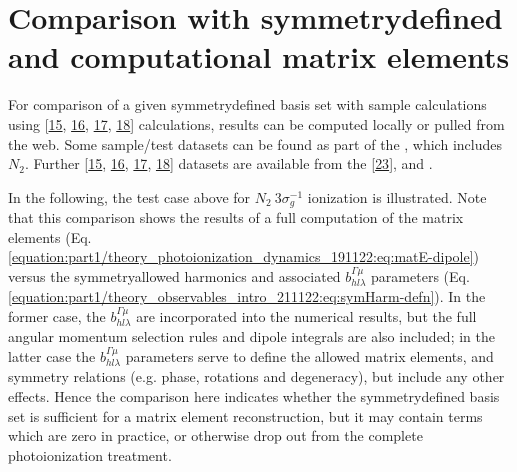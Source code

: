 \documentclass[letterpaper,table,10pt,english]{jupyterBook}
\begin{document}
\section{Comparison with symmetry\sphinxhyphen{}defined and computational matrix elements}
\label{\detokenize{part2/sym-fitting-intro_220423:comparison-with-symmetry-defined-and-computational-matrix-elements}}\label{\detokenize{part2/sym-fitting-intro_220423:sec-basis-sets-comparison-with-abinitio}}
\sphinxAtStartPar
For comparison of a given symmetry\sphinxhyphen{}defined basis set with sample  calculations using  {[}\hyperlink{cite.backmatter/bibliography:id693}{15}, \hyperlink{cite.backmatter/bibliography:id567}{16}, \hyperlink{cite.backmatter/bibliography:id725}{17}, \hyperlink{cite.backmatter/bibliography:id696}{18}{]} calculations, results can be computed locally or pulled from the web. Some sample/test datasets can be found as part of the , which includes \(N_2\). Further  {[}\hyperlink{cite.backmatter/bibliography:id693}{15}, \hyperlink{cite.backmatter/bibliography:id567}{16}, \hyperlink{cite.backmatter/bibliography:id725}{17}, \hyperlink{cite.backmatter/bibliography:id696}{18}{]} datasets are available from the  {[}\hyperlink{cite.backmatter/bibliography:id615}{23}{]}, and .

\sphinxAtStartPar
In the following, the test case above for \(N_2~3\sigma_g^{-1}\) ionization is illustrated. Note that this comparison shows the results of a full  computation of the matrix elements (Eq. \eqref{equation:part1/theory_photoionization_dynamics_191122:eq:matE-dipole}) versus the symmetry\sphinxhyphen{}allowed harmonics and associated \(b_{hl\lambda}^{\Gamma\mu}\) parameters (Eq. \eqref{equation:part1/theory_observables_intro_211122:eq:symHarm-defn}). In the former case, the \(b_{hl\lambda}^{\Gamma\mu}\) are incorporated into the numerical results, but the full angular momentum selection rules and dipole integrals are also included; in the latter case the \(b_{hl\lambda}^{\Gamma\mu}\) parameters serve to define the allowed matrix elements, and symmetry relations (e.g. phase, rotations and degeneracy), but  include any other effects. Hence the comparison here indicates whether the symmetry\sphinxhyphen{}defined basis set is sufficient for a matrix element reconstruction, but it may contain terms which are zero in practice, or otherwise drop out from the complete photoionization treatment.
\end{document}
